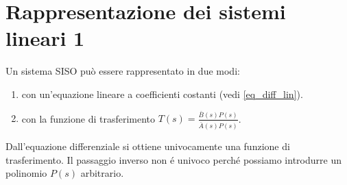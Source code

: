 \documentclass[../main.tex]{subfiles}
\begin{document}
	\section{Rappresentazione dei sistemi lineari 1}
		Un sistema SISO può essere rappresentato in due modi:
		\begin{enumerate}
			\item
				con un'equazione lineare a coefficienti costanti (vedi \ref{eq_diff_lin}).
			\item 
				con la funzione di trasferimento $ T(s) = \frac{\bar{B}(s)P(s)}{\overset{ }{\bar{A}(s)P(s)}} $.
		\end{enumerate}
		Dall'equazione differenziale si ottiene univocamente una funzione di trasferimento. Il passaggio inverso non \'{e} univoco perch\'{e} possiamo introdurre un polinomio $ P(s) $ arbitrario.
		
\end{document}
